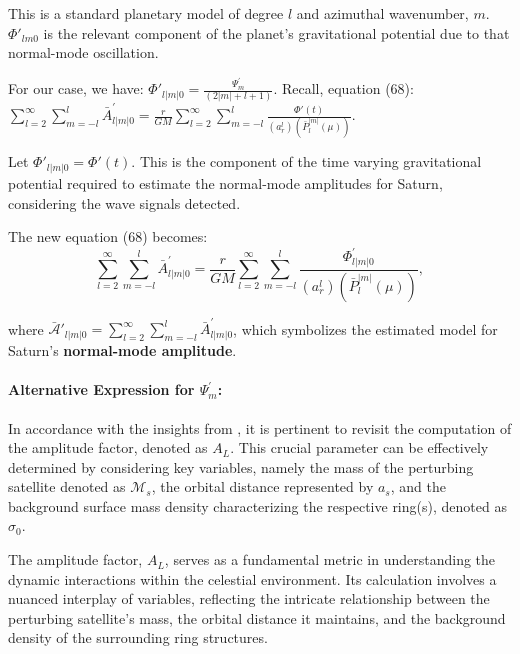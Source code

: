 \documentclass{article}
\begin{document}
This is a standard planetary model of degree $l$ and azimuthal wavenumber, $m$. $\Phi{'}_{lm0}$ is the relevant component of the planet’s gravitational potential due to that normal-mode oscillation. 

For our case, we have: $\Phi{'}_{l|m|0} = \frac{\Psi^{'}_{m}}{(2|m| + l + 1)}$. Recall, equation (68): $\sum_{l=2}^{\infty}\sum_{m=-l}^{l}\bar{A}_{l|m|0}^{'} =\frac{r}{GM} \sum_{l=2}^{\infty}\sum_{m=-l}^{l}\frac{{\Phi}{'}(t)}{(a_{r}^{l})(\bar{P}_{l}^{|m|}(\mu))}$. 

Let $\Phi{'}_{l|m|0} = \Phi{'}(t)$. This is the component of the time varying gravitational potential required to estimate the normal-mode amplitudes for Saturn, considering the wave signals detected. 

The new equation (68) becomes: 
\begin{equation}
    \sum_{l=2}^{\infty}\sum_{m=-l}^{l}\bar{A}_{l|m|0}^{'} =\frac{r}{GM} \sum_{l=2}^{\infty}\sum_{m=-l}^{l}\frac{{\Phi}^{'}_{l|m|0}}{(a_{r}^{l})(\bar{P}_{l}^{|m|}(\mu))},
\end{equation}

where $\mathscr{\bar{A}'}_{l|m|0} = \sum_{l=2}^{\infty}\sum_{m=-l}^{l}\bar{A}_{l|m|0}^{'}$, which symbolizes the estimated model for Saturn's \textbf{normal-mode amplitude}.

\paragraph{Alternative Expression for $\Psi^{'}_{m}$:}

In accordance with the insights from \cite{Nicholson1990AnAR}, it is pertinent to revisit the computation of the amplitude factor, denoted as $A_{L}$. This crucial parameter can be effectively determined by considering key variables, namely the mass of the perturbing satellite denoted as $\mathcal{M}_{s}$, the orbital distance represented by $a_{s}$, and the background surface mass density characterizing the respective ring(s), denoted as $\sigma_{0}$.

The amplitude factor, $A_{L}$, serves as a fundamental metric in understanding the dynamic interactions within the celestial environment. Its calculation involves a nuanced interplay of variables, reflecting the intricate relationship between the perturbing satellite's mass, the orbital distance it maintains, and the background density of the surrounding ring structures.
\end{document}

